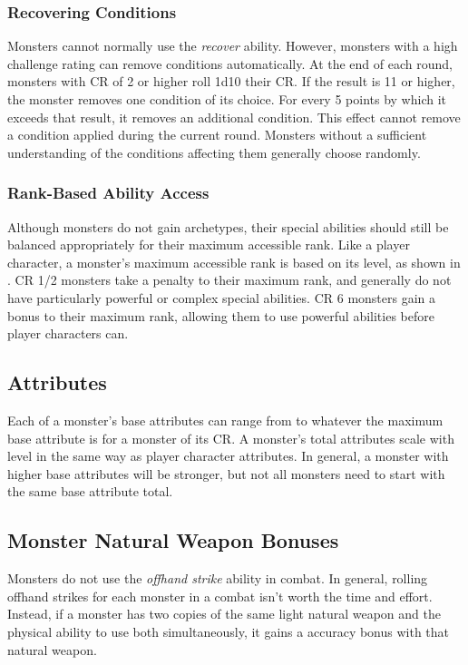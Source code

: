         \subsubsection{Recovering Conditions}
            Monsters cannot normally use the \textit{recover} ability.
            However, monsters with a high challenge rating can remove conditions automatically.
            At the end of each round, monsters with CR of 2 or higher roll 1d10 \add their CR.
            If the result is 11 or higher, the monster removes one condition of its choice.
            For every 5 points by which it exceeds that result, it removes an additional condition.
            This effect cannot remove a condition applied during the current round.
            Monsters without a sufficient understanding of the conditions affecting them generally choose randomly.

        \subsubsection{Rank-Based Ability Access}
            Although monsters do not gain archetypes, their special abilities should still be balanced appropriately for their maximum accessible rank.
            Like a player character, a monster's maximum accessible rank is based on its level, as shown in .
            CR 1/2 monsters take a  penalty to their maximum rank, and generally do not have particularly powerful or complex special abilities.
            CR 6 monsters gain a  bonus to their maximum rank, allowing them to use powerful abilities before player characters can.

    \subsection{Attributes}
        Each of a monster's base attributes can range from  to whatever the maximum base attribute is for a monster of its CR.
        A monster's total attributes scale with level in the same way as player character attributes.
        In general, a monster with higher base attributes will be stronger, but not all monsters need to start with the same base attribute total.

    \subsection{Monster Natural Weapon Bonuses}\label{Monster Natural Weapon Bonuses}
        Monsters do not use the \textit{offhand strike} ability in combat.
        In general, rolling offhand strikes for each monster in a combat isn't worth the time and effort.
        Instead, if a monster has two copies of the same light natural weapon and the physical ability to use both simultaneously, it gains a  accuracy bonus with that natural weapon.

